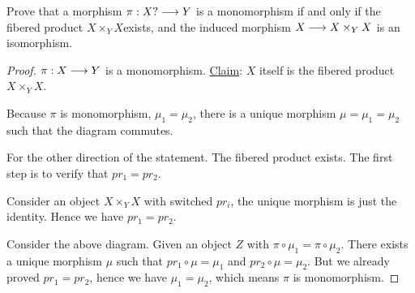\begin{exr}
Prove that a morphism $\pi: X ?\longrightarrow Y$ is a monomorphism if and only if the fibered product $X \times_Y X $exists, and the induced morphism $X \longrightarrow  X \times_Y X$ is an isomorphism.
\end{exr}
\begin{proof}
$\pi:X\longrightarrow Y$ is a monomorphism. \underline{Claim}: $X$ itself is the fibered product $X\times_Y X$.
\begin{center}
\end{center}
Because $\pi$ is monomorphism, $\mu_1=\mu_2$, there is a unique morphism $\mu=\mu_1=\mu_2$ such that the diagram commutes.

For the other direction of the statement. The fibered product exists. The first step is to verify that $pr_1=pr_2$.
\begin{center}
\end{center}
Consider an object $X\times_Y X$ with switched $pr_i$, the unique morphism is just the identity. Hence we have $pr_1=pr_2$.

\begin{center}
\end{center}
Consider the above diagram. Given an object $Z$ with $\pi\circ\mu_1=\pi\circ \mu_2$. There exists a unique morphism $\mu$ such that $pr_1\circ\mu=\mu_1$ and $pr_2\circ \mu=\mu_2$. But we already proved $pr_1=pr_2$, hence we have $\mu_1=\mu_2$, which means $\pi$ is monomorphism.
\end{proof}


